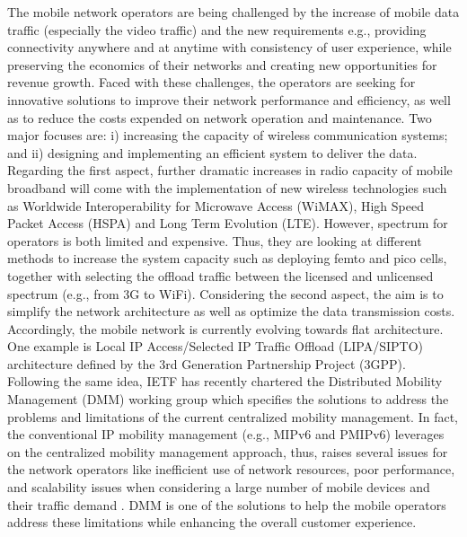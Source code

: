 The mobile network operators are being challenged by the increase of mobile data traffic (especially the video traffic) and the new requirements e.g., providing connectivity anywhere and at anytime with consistency of user experience, while preserving the economics of their networks and creating new opportunities for revenue growth. Faced with these challenges, the operators are seeking for innovative solutions to improve their network performance and efficiency, as well as to reduce the costs expended on network operation and maintenance. Two major focuses are: i) increasing the capacity of wireless communication systems;  and ii) designing and implementing an efficient system to deliver the data. Regarding the first aspect, further dramatic increases in radio capacity of mobile broadband will come with the implementation of new wireless technologies such as Worldwide Interoperability for Microwave Access (WiMAX), High Speed Packet Access (HSPA) and Long Term Evolution (LTE). However, spectrum for operators is both limited and expensive. Thus, they are looking at different methods to increase the system capacity such as deploying femto and pico cells, together with selecting the offload traffic between the licensed and unlicensed spectrum (e.g., from 3G to WiFi). Considering the second aspect, the aim is to simplify the network architecture as well as optimize the data transmission costs. Accordingly, the mobile network is currently evolving towards flat architecture. One example is Local IP Access/Selected IP Traffic Offload (LIPA/SIPTO) architecture defined by the 3rd Generation Partnership Project (3GPP). Following the same idea, IETF has recently chartered the Distributed Mobility Management (DMM) working group which specifies the solutions to address the problems and limitations of the current centralized mobility management. In fact, the conventional IP mobility management (e.g., MIPv6 and PMIPv6) leverages on the centralized mobility management approach, thus,  raises several issues for the network operators like inefficient use of network resources, poor performance, and scalability issues when considering a large number of mobile devices and their traffic demand \cite{DMM_requirements, DMM_issues,DMM_problem_statement}. DMM is one of the solutions to help the mobile operators address these limitations while enhancing the overall customer experience.  \\



